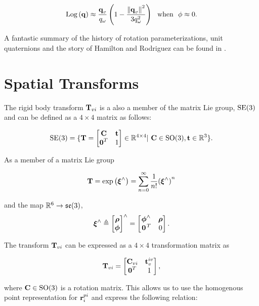 \begin{equation}
	\mathrm{Log}\left({\boldsymbol{\mathbf{q}}}\right) \approx \frac{\boldsymbol{\mathbf{q}}_v}{q_\omega} \left( 1 - \frac{\left\Vert\boldsymbol{\mathbf{q}}_v\right\Vert^2}{3 q_\omega^2}\right) ~~ \textrm{when} ~~ \phi \approx 0. 
\end{equation}

A fantastic summary of the history of rotation parameterizations, unit quaternions and the story of Hamilton and Rodriguez can be found in \cite{Altmann1989-ru}.



\section{Spatial Transforms}
The rigid body transform $\boldsymbol{\mathbf{T}}_{vi}$ is a also a member of the matrix Lie group, $\mathrm{SE}(3)$ and can be defined as a $4 \times 4$ matrix as follows:

\begin{equation}
\mathrm{SE}(3) = \{ \boldsymbol{\mathbf{T}} = \begin{bmatrix} \boldsymbol{\mathbf{C}} & \boldsymbol{\mathbf{t}} \\ \boldsymbol{\mathbf{0}}^T & 1 \end{bmatrix} \in \mathbb{R}{}^{4 \times 4} | ~  \boldsymbol{\mathbf{C}} \in \mathrm{SO}(3),  \boldsymbol{\mathbf{t}} \in \mathbb{R}{}^3  \}.
\end{equation}

As a member of a matrix Lie group

\begin{equation}
\boldsymbol{\mathbf{T}} = \mathrm{exp}\left({\boldsymbol{\mathbf{\xi}}}^{\wedge}\right) = \sum_{n=0}^{\infty}  \frac{1}{n!} {(\boldsymbol{\mathbf{\xi}}^\wedge)}^n	
\end{equation}

and the map $\RealNumbers[6]\to\mathfrak{se}(3)$,
\begin{equation}
  \boldsymbol{\mathbf{\xi}}^\wedge \triangleq \begin{bmatrix} \boldsymbol{\mathbf{\rho}} \\ \boldsymbol{\mathbf{\phi}} \end{bmatrix} ^\wedge = \begin{bmatrix}
  \boldsymbol{\mathbf{\phi}}^\wedge & \boldsymbol{\mathbf{\rho}} \\ \left.{\boldsymbol{\mathbf{0}}}\right.^T &  0 \end{bmatrix}.	
\end{equation}

The transform $\boldsymbol{\mathbf{T}}_{vi}$ can be expressed as a $4 \times 4$ transformation matrix as

\begin{equation}
\boldsymbol{\mathbf{T}}_{vi} = \begin{bmatrix} \boldsymbol{\mathbf{C}}_{vi} & \boldsymbol{\mathbf{t}}_v^{iv} \\ \boldsymbol{\mathbf{0}}^T & 1 \end{bmatrix},
\end{equation}

where $\boldsymbol{\mathbf{C}} \in \mathrm{SO}(3)$ is a rotation matrix. This allows us to use the homogenous point representation for $\boldsymbol{\mathbf{r}}^{pi}_i$ and express the following relation:

